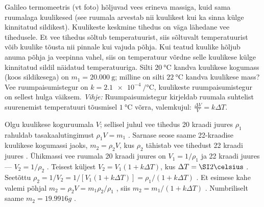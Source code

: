 Galileo termomeetris (vt foto) hõljuvad vees erineva massiga, kuid sama ruumalaga kuulikesed (see ruumala arvestab nii kuulikest kui ka sinna külge kinnitatud sildikest). Kuulikeste keskmine tihedus on väga lähedane vee tihedusele. Et vee tihedus sõltub temperatuurist, siis sõltuvalt temperatuurist võib kuulike tõusta nii pinnale kui vajuda põhja. Kui teatud kuulike hõljub anuma põhja ja veepinna vahel, siis on temperatuur võrdne selle kuulikese külge kinnitatud sildil näidatud temperatuuriga. Silti $\SI{20}\celsius$ kandva kuulikese kogumass (koos sildikesega) on $m_1=\SI{20.000}{\g}$; milline on silti $\SI{22}\celsius$ kandva kuulikese mass? Vee ruumpaisumistegur on $k=\SI{2.1e-4}{\per\celsius}$, kuulikeste ruumpaisumistegur on sellest hulga väiksem. \textit{Vihje:} Ruumpaisumistegur kirjeldab ruumala suhtelist suurenemist temperatuuri tõusmisel $\SI{1}{\celsius}$ võrra, valemkujul: $\frac{\Delta V}{V} = k\Delta T$.


\hint

\solu
Olgu kuulikese koguruumala $V$; sellisel juhul vee tihedus 20 kraadi juures $\rho_1$ rahuldab tasakaalutingimust $\rho_1V=m_1$ . Sarnase seose saame 22-kraadise kuulikese kogumassi jaoks, $m_2=\rho_2V$, kus  $\rho_2$ tähistab vee tihedust 22 kraadi juures . Ühikmassi vee ruumala 20 kraadi juures on $V_1=1/\rho_1$ ja 22 kraadi juures ---  $V_2=1/\rho_2$ . Teisest küljest $V_2=V_1(1+k\Delta T)$, kus $\Delta T=\SI 2\celsius$ . Seetõttu $\rho_2=1/V_2=1/[V_1(1+k\Delta T)]=\rho_1/(1+k\Delta T)$ . Et  esimese kahe valemi põhjal $m_2=\rho_2V=m_1\rho_2/\rho_1$ , siis  $m_2=m_1/(1 + k\Delta T) $ . Numbriliselt saame $m_2= \SI{19.9916}g$ .
\probend